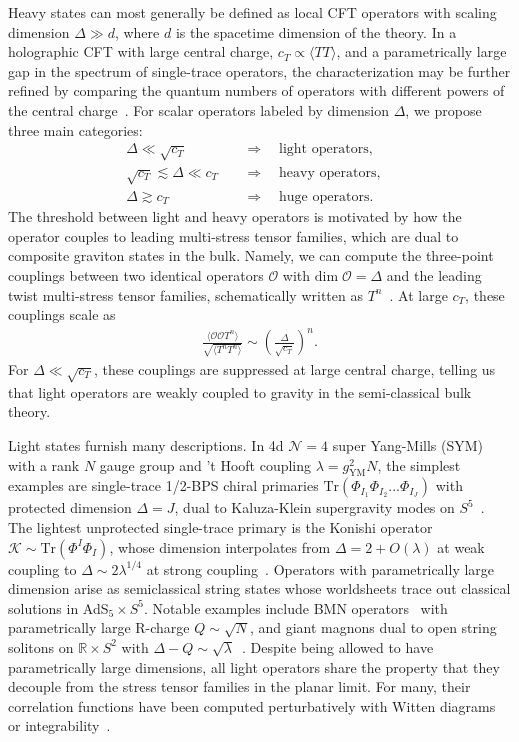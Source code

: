 \documentclass[a4paper,11pt]{article}
\theoremstyle{plain}
\theoremstyle{definition}
\theoremstyle{remark}
\newcommand{\cO}{\mathcal O}
\newcommand{\ba}{\begin{equation} \begin{aligned}}
\newcommand{\ea}{\end{aligned} \end{equation}}
\newcommand{\De}{\Delta}
\begin{document}
Heavy states can most generally be defined as local CFT operators with scaling dimension $\De \gg d$, where $d$ is the spacetime dimension of the theory. In a holographic CFT with large central charge, $c_T \propto \langle T T\rangle$, and a parametrically large gap in the spectrum of single-trace operators, the characterization may be further refined by comparing the quantum numbers of operators with different powers of the central charge~\cite{Hartman:2014oaa, Asplund:2014coa, Ghosh:2019rcj,Pal:2023cgk,Alkalaev:2024knk}. For scalar operators labeled by dimension $\De$, we propose three main categories:
\ba
\De \ll \sqrt{c_T} \quad & \Rightarrow \quad  \text{light operators},& \\
 \sqrt{c_T} \lesssim \De \ll c_T \quad & \Rightarrow \quad \text{heavy operators},\\
 \De \gtrsim c_T \quad & \Rightarrow \quad \text{huge operators}.
\ea
The threshold between light and heavy operators is motivated by how the operator couples to leading multi-stress tensor families, which are dual to composite graviton states in the bulk. Namely, we can compute the three-point couplings between two identical operators $\cO$ with $\mathrm{dim}\; \cO = \De$ and the leading twist multi-stress tensor families, schematically written as $T^n$~\cite{Karlsson:2021duj}. At large $c_T$, these couplings scale as
\ba
\frac{\langle \cO \cO T^n\rangle}{\sqrt{\langle T^n T^n \rangle }} \sim \left(\frac{\De}{\sqrt{c_T} }\right)^n.
\ea
For $ \De \ll \sqrt{c_T}$, these couplings are suppressed at large central charge, telling us that light operators are weakly coupled to gravity in the semi-classical bulk theory. 

Light states furnish many descriptions. In 4d $\mathcal{N} = 4$ super Yang-Mills (SYM) with a rank $N$ gauge group and 't Hooft coupling $\lambda = g_{\mathrm{YM}}^2N$, the simplest examples are single-trace 1/2-BPS chiral primaries $\mathrm{Tr}(\Phi_{I_1} \Phi_{I_2} ... \Phi_{I_J})$ with protected dimension $\De = J$, dual to Kaluza-Klein supergravity modes on $S^5$~\cite{Arutyunov:2003ad}. The lightest unprotected single-trace primary is the Konishi operator $\mathcal{K} \sim \mathrm{Tr}(\Phi^I \Phi_I)$, whose dimension interpolates from $\De = 2 + O(\lambda)$ at weak coupling to $\De \sim 2\lambda^{1/4}$ at strong coupling~\cite{Eden:2012fe,Gromov:2013pga}. Operators with parametrically large dimension arise as semiclassical string states whose worldsheets trace out classical solutions in AdS${}_5 \times S^5$. Notable examples include BMN operators~\cite{Berenstein:2002adc} with parametrically large R-charge $Q\sim \sqrt{N}$, and giant magnons dual to open string solitons on $\mathbb{R} \times S^2$ with $\De - Q \sim \sqrt{\lambda}$~\cite{Hofman:2006xt}. Despite being allowed to have parametrically large dimensions, all light operators share the property that they decouple from the stress tensor families in the planar limit. For many, their correlation functions have been computed perturbatively with Witten diagrams or integrability~\cite{Arutyunov:2003ad, Beisert:2010jr, Chicherin_2016, Chicherin:2018avq}. 
\end{document}
